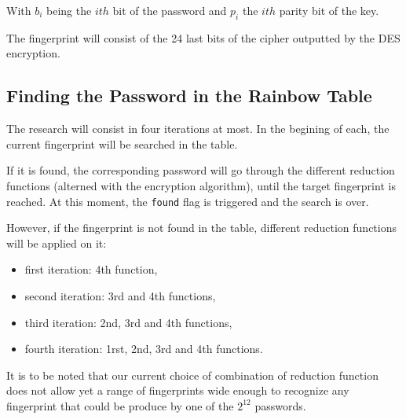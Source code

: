 \documentclass[a4paper,11pt]{article}
\begin{document}
With $b_i$ being the $ith$ bit of the password and $p_i$ the $ith$ parity bit of the key.

The fingerprint will consist of the 24 last bits of the cipher outputted by the DES encryption.

\subsection{Finding the Password in the Rainbow Table}
The research will consist in four iterations at most. In the begining of each, the current fingerprint will be searched in the table.

If it is found, the corresponding password will go through the different reduction functions (alterned with the encryption algorithm), until the target fingerprint is reached.
At this moment, the \texttt{found} flag is triggered and the search is over.

However, if the fingerprint is not found in the table, different reduction functions will be applied on it:
\begin{itemize}
\item first iteration: 4th function,
\item second iteration: 3rd and 4th functions,
\item third iteration: 2nd, 3rd and 4th functions,
\item fourth iteration: 1rst, 2nd, 3rd and 4th functions.
\end{itemize}

It is to be noted that our current choice of combination of reduction function does not allow yet a range of fingerprints
wide enough to recognize any fingerprint that could be produce by one of the $2^{12}$ passwords.
\end{document}
